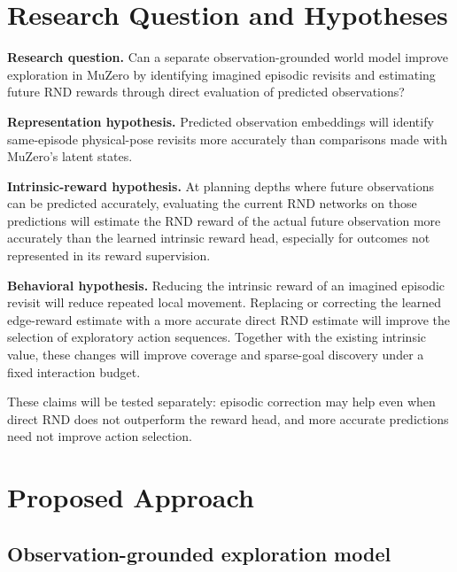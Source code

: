 \documentclass{article}
\begin{document}
\section{Research Question and Hypotheses}

\textbf{Research question.} Can a separate observation-grounded world model
improve exploration in MuZero by identifying imagined episodic revisits and
estimating future RND rewards through direct evaluation of predicted
observations?

\textbf{Representation hypothesis.} Predicted observation embeddings will
identify same-episode physical-pose revisits more accurately than comparisons
made with MuZero's latent states.

\textbf{Intrinsic-reward hypothesis.} At planning depths where future
observations can be predicted accurately, evaluating the current RND networks
on those predictions will estimate the RND reward of the actual future
observation more accurately than the learned intrinsic reward head, especially
for outcomes not represented in its reward supervision.

\textbf{Behavioral hypothesis.} Reducing the intrinsic reward of an imagined
episodic revisit will reduce repeated local movement. Replacing or correcting
the learned edge-reward estimate with a more accurate direct RND estimate will
improve the selection of exploratory action sequences. Together with the
existing intrinsic value, these changes will improve coverage and sparse-goal
discovery under a fixed interaction budget.

These claims will be tested separately: episodic correction may help even when
direct RND does not outperform the reward head, and more accurate predictions
need not improve action selection.

\section{Proposed Approach}

\subsection{Observation-grounded exploration model}
\end{document}
